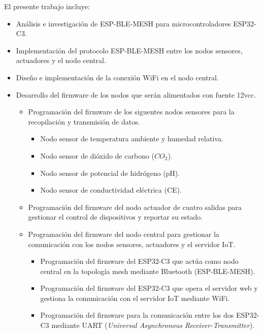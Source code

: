 El presente trabajo incluye:
\begin{itemize}
	\item Análisis e investigación de ESP-BLE-MESH para microcontroladores ESP32-C3.
	\item Implementación del protocolo ESP-BLE-MESH entre los nodos sensores, actuadores
	      y el nodo central.
	\item Diseño e implementación de la conexión WiFi en el nodo central.
	\item Desarrollo del firmware de los nodos que serán alimentados con fuente 12vcc.
	      \begin{itemize}
		      \item Programación del firmware de los siguentes nodos sensores para la recopilación
		            y transmisión de datos.
		            \begin{itemize}
			            \item Nodo sensor de temperatura ambiente y humedad relativa.
			            \item Nodo sensor de dióxido de carbono ($CO_2$).
			            \item Nodo sensor de potencial de hidrógeno (pH).
			            \item Nodo sensor de conductividad eléctrica (CE).
		            \end{itemize}
		      \item Programación del firmware del nodo actuador de cuatro salidas para gestionar el
		            control de dispositivos y reportar su estado.
		      \item Programación del firmware del nodo central para gestionar la comunicación con
		            los nodos sensores, actuadores y el servidor IoT.
		            \begin{itemize}
			            \item Programación del firmware del ESP32-C3 que actúa como nodo central en la
			                  topología mesh mediante Bluetooth (ESP-BLE-MESH).
			            \item Programación del firmware del ESP32-C3 que opera el servidor web y gestiona la
			                  comunicación con el servidor IoT mediante WiFi.
			            \item Programación del firmware para la comunicación entre los dos ESP32-C3 mediante
			                  UART (\textit{Universal Asynchronous Receiver-Transmitter}).
		            \end{itemize}
	      \end{itemize}

\end{itemize}
